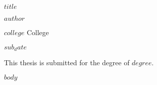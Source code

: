\documentclass{book}
\begin{document}
$title$

$author$

$college$ College

$sub_date$

This thesis is submitted for the degree of $degree$.

$body$
\end{document}
